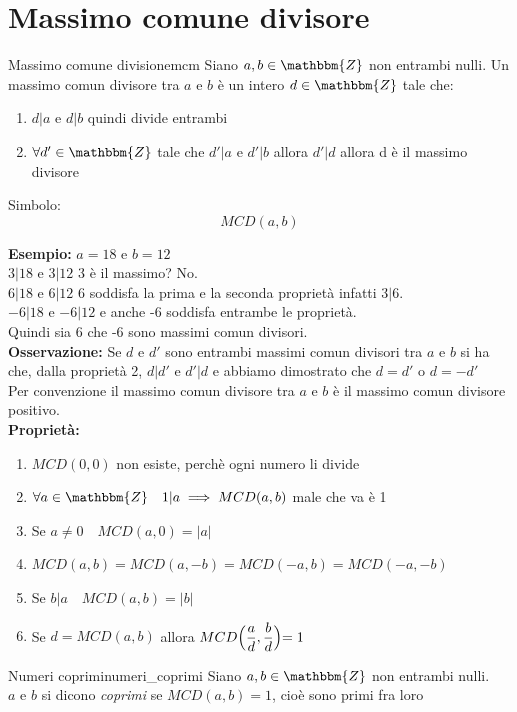 \documentclass[12pt, letterpaper]{report}
\newcounter{definition}
\newcommand{\nmu}{}
\begin{document}
		\section{Massimo comune divisore}
		\begin{definition}{\nmu Massimo comune divisione}{mcm}
			Siano $a,b \in \mathbbm{Z}$ non entrambi nulli. Un massimo comun divisore tra $a$ e $b$ è un intero $d \in \mathbbm{Z}$ tale che:
			\begin{enumerate}
				\item $d|a$ e $d|b$ quindi divide entrambi
				\item $\forall d' \in \mathbbm{Z}$ tale che $d'|a$ e $d'|b$ allora $d'|d$ allora d è il massimo divisore
			\end{enumerate}
			Simbolo:
			\[
			MCD(a,b)
			\]
		\end{definition}
		\textbf{Esempio:} $a = 18$ e $b = 12$ \\
		$3|18$ e $3|12$ 3 è il massimo? No. \\
		$6|18$ e $6|12$ 6 soddisfa la prima e la seconda proprietà infatti $3|6$. \\
		$-6|18$ e $-6|12$ e anche -6 soddisfa entrambe le proprietà. \\
		Quindi sia 6 che -6 sono massimi comun divisori. \\
		\textbf{Osservazione:} Se $d$ e $d'$ sono entrambi massimi comun divisori tra $a$ e $b$ si ha che, dalla proprietà 2, $d|d'$ e $d'|d$ e abbiamo dimostrato che $d =d'$ o $d = -d'$\\
		Per convenzione il massimo comun divisore tra $a$ e $b$ è il massimo comun divisore positivo. \\
		\textbf{Proprietà:}
		\begin{enumerate}
			\item $MCD(0,0)$ non esiste, perchè ogni numero li divide
			\item $\forall a \in \mathbbm{Z} \quad 1|a \implies MCD(a,b)$ male che va è 1
			\item Se $a \neq 0 \quad MCD(a, 0) = |a|$ \\
			\item $MCD(a,b) = MCD(a, -b) = MCD(-a, b) = MCD(-a, -b)$
			\item Se $b|a \quad MCD(a, b) = |b|$
			\item Se $d = MCD(a,b)$ allora $MCD\Bigl(\dfrac{a}{d}, \dfrac{b}{d}\Bigl ) = 1$
		\end{enumerate}
		\begin{definition}{\nmu Numeri coprimi}{numeri_coprimi}
			Siano $a,b \in \mathbbm{Z}$ non entrambi nulli. \\
			$a$ e $b$ si dicono \textit{coprimi} se $MCD(a,b) = 1$, cioè sono primi fra loro
		\end{definition}
\end{document}
